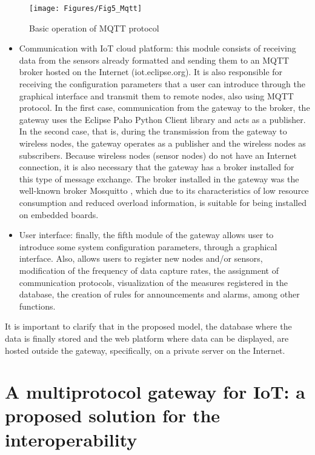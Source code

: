 \begin{figure}[ht!]
\centering
\texttt{[image: Figures/Fig5\_Mqtt]}
\caption{Basic operation of MQTT protocol}
\label{ch5_fig:5}       %
\end{figure}

\begin{itemize}
\item Communication with IoT cloud platform: this module consists of receiving data from the sensors already formatted and sending them to an MQTT broker hosted on the Internet (iot.eclipse.org). It is also responsible for receiving the configuration parameters that a user can introduce through the graphical interface and transmit them to remote nodes, also using MQTT protocol. In the first case, communication from the gateway to the broker, the gateway uses the Eclipse Paho Python Client library and acts as a publisher. In the second case, that is, during the transmission from the gateway to wireless nodes, the gateway operates as a publisher and the wireless nodes as subscribers. Because wireless nodes (sensor nodes) do not have an Internet connection, it is also necessary that the gateway has a broker installed for this type of message exchange. The broker installed in the gateway was the well-known broker Mosquitto \cite{Light2017}, which due to its characteristics of low resource consumption and reduced overload information, is suitable for being installed on embedded boards. 
\item User interface: finally, the fifth module of the gateway allows user to introduce some system configuration parameters, through a graphical interface. Also, allows users to register new nodes and/or sensors, modification of the frequency of data capture rates, the assignment of communication protocols, visualization of the measures registered in the database, the creation of rules for announcements and alarms, among other functions.
\end{itemize}

It is important to clarify that in the proposed model, the database where the data is finally stored and the web platform where data can be displayed, are hosted outside the gateway, specifically, on a private server on the Internet.

\section{A multiprotocol gateway for IoT: a proposed solution for the interoperability}
\label{sec:5.4}

